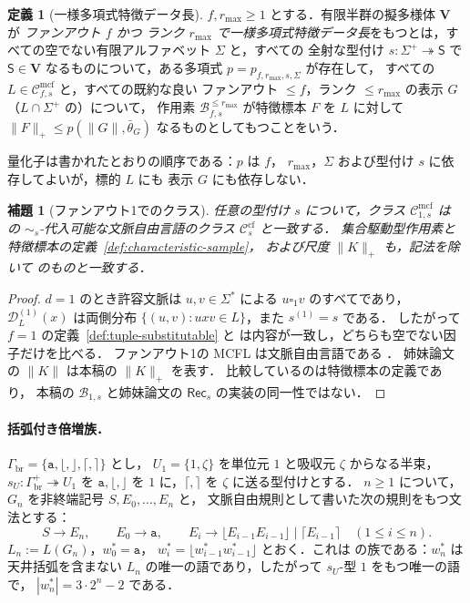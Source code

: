 \documentclass[11pt,a4paper]{ltjsarticle}
\numberwithin{equation}{section}
\theoremstyle{plain}
\newtheorem{lemma}[theorem]{補題}
\theoremstyle{definition}
\newtheorem{definition}[theorem]{定義}
\theoremstyle{remark}
\newcommand{\Cmcf}[2]{\mathcal{C}^{\mathrm{mcf}}_{#1,#2}}
\newcommand{\D}{\mathcal{D}}
\newcommand{\blank}{\square}
\theoremstyle{plain}
\begin{document}
\begin{definition}[一様多項式特徴データ長]
\label{def:uniform-polydata}
$f,r_{\max}\ge1$ とする．有限半群の擬多様体 $\mathbf V$ が
\emph{ファンアウト $f$ かつ
ランク $r_{\max}$ で一様多項式特徴データ長}をもつとは，すべての空でない有限アルファベット $\Sigma$ と，すべての
全射な型付け $s:\Sigma^+\twoheadrightarrow\mathsf S$ で
$\mathsf S\in\mathbf V$ なるものについて，ある多項式 $p=p_{f,r_{\max},s,\Sigma}$ が存在して，
すべての $L\in\Cmcf{f}{s}$ と，すべての既約な良い
ファンアウト $\le f$，ランク $\le r_{\max}$ の表示 $G$（$L\cap\Sigma^+$ の）について，
作用素 $\mathcal B^{\le r_{\max}}_{f,s}$ が特徴標本
$F$ を $L$ に対して $\|F\|_+\le p(\|G\|,\bar\theta_G)$ なるものとしてもつことをいう．
\end{definition}

量化子は書かれたとおりの順序である：$p$ は $f$，
$r_{\max}$，$\Sigma$ および型付け $s$ に依存してよいが，標的 $L$ にも
表示 $G$ にも依存しない．

\begin{lemma}[ファンアウト1でのクラス]
\label{lem:fanout-one-classes}
任意の型付け $s$ について，クラス $\Cmcf{1}{s}$ は
\cite[Definition~2.1 and Section~3]{kuriyamaCFG} の
$\sim_s$-代入可能な文脈自由言語のクラス
$\mathcal C^{\mathrm{cf}}_s$ と一致する．
集合駆動型作用素と特徴標本の定義~\ref{def:characteristic-sample}，
および尺度 $\|K\|_+$ も，記法を除いて \cite[Section~2]{kuriyamaCFG} のものと一致する．
\end{lemma}

\begin{proof}
$d=1$ のとき許容文脈は $u,v\in\Sigma^*$ による $u\blank_1v$ のすべてであり，
$\D^{(1)}_L(x)$ は両側分布 $\{(u,v):uxv\in L\}$，また $s^{(1)}=s$ である．
したがって $f=1$ の定義~\ref{def:tuple-substitutable} と
\cite[Definition~2.1]{kuriyamaCFG} は内容が一致し，どちらも空でない因子だけを比べる．
ファンアウト1の MCFL は文脈自由言語である \cite{SekiEtAl1991}．
姉妹論文の $\|K\|$ は本稿の $\|K\|_+$ を表す．
比較しているのは特徴標本の定義であり，
本稿の $\mathcal B_{1,s}$ と姉妹論文の $\mathsf{Rec}_s$ の実装の同一性ではない．
\end{proof}

\paragraph{括弧付き倍増族．}
$\Gamma_{\mathrm{br}}=\{\mathtt a,\lfloor,\rfloor,\lceil,\rceil\}$ とし，
$U_1=\{1,\zeta\}$ を単位元 $1$ と吸収元 $\zeta$ からなる半束，
$s_U:\Gamma_{\mathrm{br}}^+\twoheadrightarrow U_1$ を
$\mathtt a,\lfloor,\rfloor$ を $1$ に，$\lceil,\rceil$ を $\zeta$ に送る型付けとする．
$n\ge1$ について，$G_n$ を非終端記号 $S,E_0,\ldots,E_n$ と，
文脈自由規則として書いた次の規則をもつ文法とする：
\[
 S\to E_n,\qquad E_0\to\mathtt a,\qquad
 E_i\to\lfloor E_{i-1}E_{i-1}\rfloor\mid\lceil E_{i-1}\rceil
 \quad(1\le i\le n).
\]
$L_n:=L(G_n)$，$w^*_0=\mathtt a$，
$w^*_i=\lfloor w^*_{i-1}w^*_{i-1}\rfloor$ とおく．これは
\cite[Section~6]{kuriyamaCFG} の族である：$w^*_n$ は天井括弧を含まない
$L_n$ の唯一の語であり，したがって $s_U$-型 $1$ をもつ唯一の語で，
$|w^*_n|=3\cdot2^n-2$ である．
\end{document}
